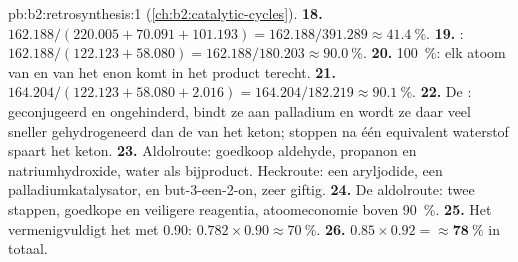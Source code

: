 \begin{solution}{pb:b2:retrosynthesis:1}
(\cref{ch:b2:catalytic-cycles}).
\textbf{18.} $162.188/(220.005 + 70.091 + 101.193) = 162.188/391.289 \approx 41.4~\%$.
\textbf{19.} : $162.188/(122.123 + 58.080) = 162.188/180.203
\approx 90.0~\%$.
\textbf{20.} 100~\%: elk atoom van  en van het enon komt in het product terecht.
\textbf{21.} $164.204/(122.123 + 58.080 + 2.016) = 164.204/182.219 \approx 90.1~\%$.
\textbf{22.} De : geconjugeerd en ongehinderd, bindt ze aan palladium en wordt ze daar veel
sneller gehydrogeneerd dan de  van het keton; stoppen na één equivalent waterstof spaart het keton.
\textbf{23.} Aldolroute: goedkoop aldehyde, propanon en natriumhydroxide, water als bijproduct.
Heckroute: een aryljodide, een palladiumkatalysator, en but-3-een-2-on, zeer giftig.
\textbf{24.} De aldolroute: twee stappen, goedkope en veiligere reagentia, atoomeconomie boven 90~\%.
\textbf{25.} Het vermenigvuldigt het met 0.90: $0.782 \times 0.90 \approx 70~\%$.
\textbf{26.} $0.85 \times 0.92 = \boldsymbol{\approx 78~\%}$ in totaal.
\end{solution}
